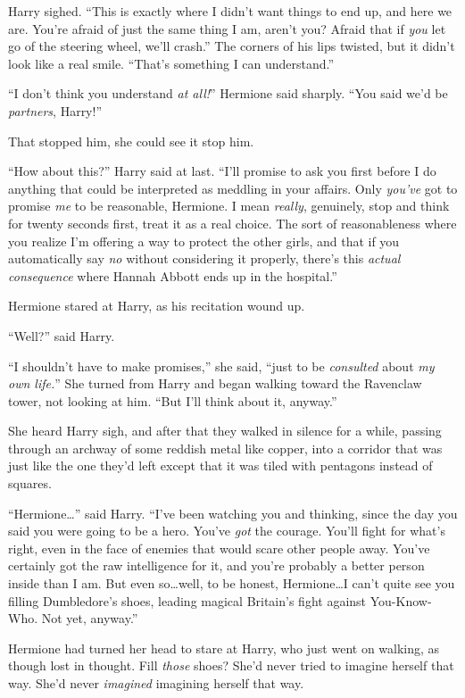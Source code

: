 Harry sighed. “This is exactly where I didn’t want things to end up, and here we are. You’re afraid of just the same thing I am, aren’t you? Afraid that if \emph{you} let go of the steering wheel, we’ll crash.” The corners of his lips twisted, but it didn’t look like a real smile. “That’s something I can understand.”

“I don’t think you understand \emph{at all!}” Hermione said sharply. “You said we’d be \emph{partners}, Harry!”

That stopped him, she could see it stop him.

“How about this?” Harry said at last. “I’ll promise to ask you first before I do anything that could be interpreted as meddling in your affairs. Only \emph{you’ve} got to promise \emph{me} to be reasonable, Hermione. I mean \emph{really}, genuinely, stop and think for twenty seconds first, treat it as a real choice. The sort of reasonableness where you realize I’m offering a way to protect the other girls, and that if you automatically say \emph{no} without considering it properly, there’s this \emph{actual consequence} where Hannah Abbott ends up in the hospital.”

Hermione stared at Harry, as his recitation wound up.

“Well?” said Harry.

“I shouldn’t have to make promises,” she said, “just to be \emph{consulted} about \emph{my own life.}” She turned from Harry and began walking toward the Ravenclaw tower, not looking at him. “But I’ll think about it, anyway.”

She heard Harry sigh, and after that they walked in silence for a while, passing through an archway of some reddish metal like copper, into a corridor that was just like the one they’d left except that it was tiled with pentagons instead of squares.

“Hermione…” said Harry. “I’ve been watching you and thinking, since the day you said you were going to be a hero. You’ve \emph{got} the courage. You’ll fight for what’s right, even in the face of enemies that would scare other people away. You’ve certainly got the raw intelligence for it, and you’re probably a better person inside than I am. But even so…well, to be honest, Hermione…I can’t quite see you filling Dumbledore’s shoes, leading magical Britain’s fight against You-Know-Who. Not yet, anyway.”

Hermione had turned her head to stare at Harry, who just went on walking, as though lost in thought. Fill \emph{those} shoes? She’d never tried to imagine herself that way. She’d never \emph{imagined} imagining herself that way.

